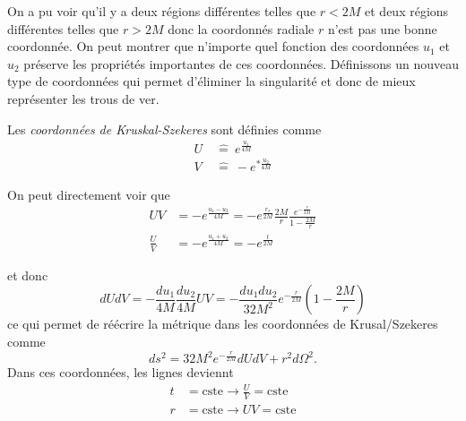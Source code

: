 \documentclass[a4paper,11pt]{report}
\begin{document}
            On a pu voir qu'il y a deux régions différentes telles que $r<2M$ et deux régions différentes telles que $r>2M$ donc la coordonnés radiale $r$ n'est pas une bonne coordonnée. On peut montrer que n'importe quel fonction des coordonnées $u_1$ et $u_2$ préserve les propriétés importantes de ces coordonnées. Définissons un nouveau type de coordonnées qui permet d'éliminer la singularité et donc de mieux représenter les trous de ver.
            
            \begin{defn}
                Les \textit{coordonnées de Kruskal-Szekeres} sont définies comme
                \begin{align}
                    U ~&\hat{=}~ e^{\frac{u_1}{4M}}\\
                    V ~&\hat{=}~ -e^{*\frac{u_2}{4M}}
                \end{align}
            \end{defn}
            
            On peut directement voir que 
            \begin{align}
                UV &= -e^{\frac{u_1-u_2}{4M}} = -e^{\frac{r_*}{2M}}\frac{2M}{r}\frac{e^{-\frac{r}{2M}}}{1-\frac{2M}{r}}\\
                \frac{U}{V} &= -e^{\frac{u_1+u_2}{4M}} = -e^{\frac{t}{2M}}
            \end{align}
            
            et donc
            \begin{equation}
                dUdV = -\frac{du_1}{4M}\frac{du_2}{4M}UV = -\frac{du_1du_2}{32M^2}e^{-\frac{r}{2M}}\left( 1-\frac{2M}{r} \right)
            \end{equation}
            ce qui permet de réécrire la métrique dans les coordonnées de Krusal/Szekeres comme
            \begin{equation}
                ds^2 = 32M^2e^{-\frac{r}{2M}}dUdV+r^2d\Omega^2.
            \end{equation}
            Dans ces coordonnées, les lignes deviennt
            \begin{align}
                t &= \text{cste} \to \frac{U}{V} = \text{cste}\\
                r &= \text{cste} \to UV = \text{cste}
            \end{align}
            
            
            
\end{document}
